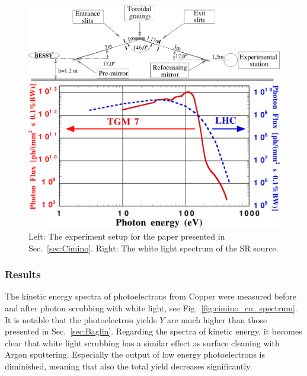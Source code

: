 \begin{figure}[tbh]
    \centering
    \begin{minipage}[c]{0.65\textwidth}
    	\includegraphics[width=1\textwidth]{../ss/cimino_setup.png}
    \end{minipage}
    \hspace{0.5cm}
    \begin{minipage}[c]{0.30\textwidth}
    	\includegraphics[width=1.0\textwidth]{../ss/cimino_wl_spectrum.png}
    \end{minipage}
    \caption{Left: The experiment setup for the paper presented in Sec.~\ref{sec:Cimino}. Right: The white light spectrum of the SR source.}
    \label{fig:cimino_setup}
\end{figure}


\subsubsection{Results}

The kinetic energy spectra of photoelectrons from Copper were measured before and after photon scrubbing with white light, see Fig.~\ref{fig:cimino_cu_spectrum}.
It is notable that the photoelectron yields $Y$ are much higher than those presented in Sec.~\ref{sec:Baglin}.
Regarding the spectra of kinetic energy, it becomes clear that white light scrubbing has a similar effect as surface cleaning with Argon sputtering.
Especially the output of low energy photoelectrons is diminished, meaning that also the total yield decreases significantly.

